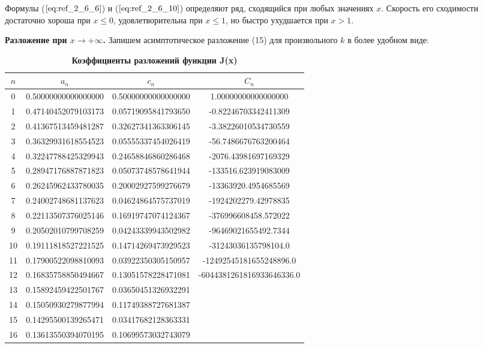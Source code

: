 Формулы ($\ref{eq:ref_2_6_6}$) и ($\ref{eq:ref_2_6_10}$) определяют ряд, сходящийся при любых значениях $x$.
Скорость его сходимости достаточно хороша при $x \leqslant 0$, удовлетворительна при
$x \leqslant 1$, но быстро ухудшается при $x > 1$.

\textbf{Разложение при $x \to +\infty$.} Запишем асимптотическое разложение (15) для
произвольного $k$ в более удобном виде:

\begin{table}[]
\caption{\textbf{Коэффициенты разложений функции J(x)}}
\begin{center}
\begin{tabular}{|c|c|c|c|}
\hline
$n$ & $a_n$ & $c_n$ & $C_n$ \\
\hline
0 & 0.50000000000000000 & 0.50000000000000000 & 1.00000000000000000 \\
1 & 0.47140452079103173 & 0.05719095841793650 & -0.82246703342411309 \\
2 & 0.41367513459481287 & 0.32627341363306145 & -3.38226010534730559 \\
3 & 0.36329931618554523 & 0.05555337454026419 & -56.7486676763200464 \\
4 & 0.32247788425329943 & 0.24658846860286468 & -2076.43981697169329 \\
5 & 0.28947176887871823 & 0.05073748578641944 & -133516.623919083009 \\
6 & 0.26245962433780035 & 0.20002927599276679 & -13363920.4954685569 \\
7 & 0.24002748681137623 & 0.04624864575737019 & -1924202279.42978835 \\
8 & 0.22113507376025146 & 0.16919747074124367 & -376996608458.572022 \\
9 & 0.20502010799708259 & 0.04243339943502982 & -96469021655492.7344 \\
10 & 0.19111818527221525 & 0.14714269473929523 & -31243036135798104.0  \\
11 & 0.17900522098810093 & 0.03922350305150957 & -12492545181655248896.0 \\
12 & 0.16835758850494667 & 0.13051578228471081 & -6044381261816933646336.0 \\
13 & 0.15892459422501767 & 0.03650451326932291 &                      \\
14 & 0.15050930279877994 & 0.11749388727681387 &                      \\
15 & 0.14295500139265471 & 0.03417682128363331 &                      \\
16 & 0.13613550394070195 & 0.10699573032743079 &                      \\

\end{tabular}
\end{center}
\end{table}
